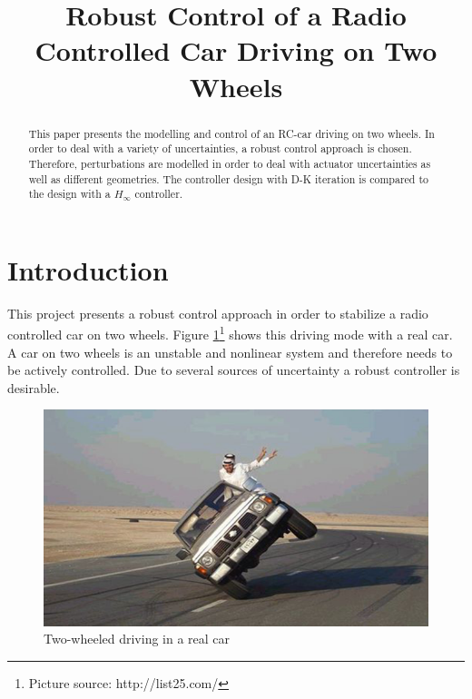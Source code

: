\documentclass[conference]{IEEEtran}
\begin{document}
\title{Robust Control of a Radio Controlled Car Driving on Two Wheels }


\author{
}

\maketitle

\begin{abstract}

This paper presents the modelling and control of an RC-car driving on two wheels. In order to deal with a variety of uncertainties, a robust control approach is chosen. Therefore, perturbations are modelled in order to deal with actuator uncertainties as well as different geometries. The controller design with D-K iteration is compared to the design with a $H_{\infty}$ controller.

\end{abstract}

\section{Introduction}

This project presents a robust control approach in order to stabilize a radio controlled car on two wheels. Figure \ref{figure:arab_driving}\footnote{Picture source: http://list25.com/} shows this driving mode with a real car. A car on two wheels is an unstable and nonlinear system and therefore needs to be actively controlled. Due to several sources of uncertainty a robust controller is desirable.

\begin{figure}[h]
\centering
  \includegraphics[width=.47\textwidth]{pics/drivesensibly.png} 
  \caption{Two-wheeled driving in a real car}  
  \label{figure:arab_driving}
\end{figure}
\end{document}
